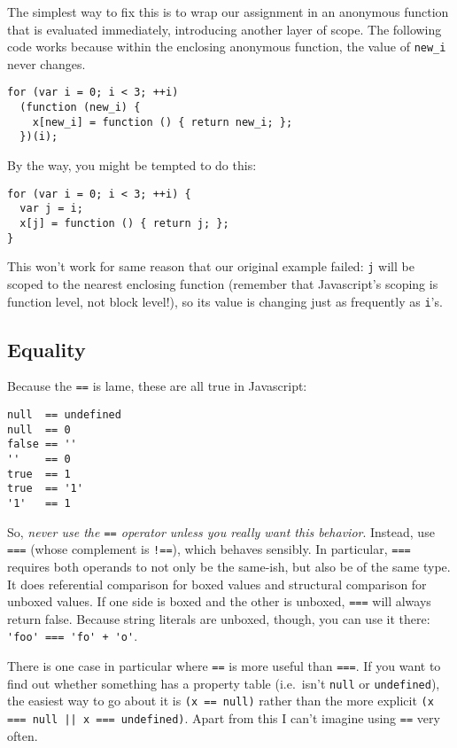 \documentclass{article}
\begin{document}
    The simplest way to fix this is to wrap our assignment in an anonymous function that is evaluated immediately, introducing another layer of scope. The following code works because within
    the enclosing anonymous function, the value of \verb|new_i| never changes.

\begin{verbatim}
for (var i = 0; i < 3; ++i)
  (function (new_i) {
    x[new_i] = function () { return new_i; };
  })(i);
\end{verbatim}

    By the way, you might be tempted to do this:

\begin{verbatim}
for (var i = 0; i < 3; ++i) {
  var j = i;
  x[j] = function () { return j; };
}
\end{verbatim}

    This won't work for same reason that our original example failed: \verb|j| will be scoped to the nearest enclosing function (remember that Javascript's scoping is function level, not block
    level!), so its value is changing just as frequently as \verb|i|'s.

\subsection {Equality}
    Because the \verb|==| is lame, these are all true in Javascript:

\begin{verbatim}
null  == undefined
null  == 0
false == ''
''    == 0
true  == 1
true  == '1'
'1'   == 1
\end{verbatim}

    So, {\it never use the {\tt ==} operator unless you really want this behavior}. Instead, use \verb|===| (whose complement is \verb|!==|), which behaves sensibly. In particular, \verb|===|
    requires both operands to not only be the same-ish, but also be of the same type. It does referential comparison for boxed values and structural comparison for unboxed values. If one side
    is boxed and the other is unboxed, \verb|===| will always return false. Because string literals are unboxed, though, you can use it there: \verb|'foo' === 'fo' + 'o'|.

    There is one case in particular where {\tt ==} is more useful than {\tt ===}. If you want to find out whether something has a property table (i.e.~isn't {\tt null} or {\tt undefined}), the
    easiest way to go about it is {\tt (x == null)} rather than the more explicit \verb+(x === null || x === undefined)+. Apart from this I can't imagine using {\tt ==} very often.
\end{document}
